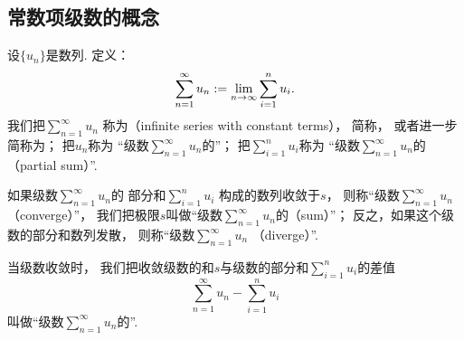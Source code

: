 \subsection{常数项级数的概念}
\begin{definition}\label{definition:无穷级数.常数项级数的定义}
设\(\{u_n\}\)是数列.
定义：\[
	\sum_{n=1}^\infty u_n
	:=
	\lim_{n\to\infty} \sum_{i=1}^n u_i.
\]
我们把\(\sum_{n=1}^\infty u_n\)
称为（infinite series with constant terms），
简称，
或者进一步简称为；
把\(u_n\)称为
“级数\(\sum_{n=1}^\infty u_n\)的”；
把\(\sum_{i=1}^n u_i\)称为
“级数\(\sum_{n=1}^\infty u_n\)的（partial sum）”.

如果级数\(\sum_{n=1}^\infty u_n\)的
部分和\(\sum_{i=1}^n u_i\)
构成的数列收敛于\(s\)，
则称“级数\(\sum_{n=1}^\infty u_n\) （converge）”，
我们把极限\(s\)叫做“级数\(\sum_{n=1}^\infty u_n\)的（sum）”；
反之，如果这个级数的部分和数列发散，
则称“级数\(\sum_{n=1}^\infty u_n\) （diverge）”.

当级数收敛时，
我们把收敛级数的和\(s\)与级数的部分和\(\sum_{i=1}^n u_i\)的差值\[
	\sum_{n=1}^\infty u_n - \sum_{i=1}^n u_i
\]
叫做“级数\(\sum_{n=1}^\infty u_n\)的”.
\end{definition}


